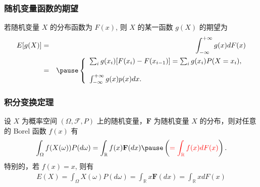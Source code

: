 \documentclass[Prob-All.tex]{subfiles}
\begin{document}
\begin{frame}
		\frametitle{随机变量函数的期望}
		\begin{thm}
			若随机变量 $X$ 的分布函数为 $F (x)$, 则 $X$ 的某一函数 $g (X)$ 的期望为
			\begin{eqnarray*}
				E[g(X)]&=&\int_{-\infty}^{+\infty}g(x)dF(x)\\
				&=&\pause \left\{
				\begin{array}{l}
					\sum_{i}g(x_i)[F(x_i)-F(x_{i-1})]=\sum_{i}g(x_i)P(X=x_i),\\
					\\
					\int_{-\infty}^{+\infty}g(x)p(x)dx.
				\end{array}
				\right.
			\end{eqnarray*}

		\end{thm}
	\end{frame}
\begin{frame}
		\frametitle{积分变换定理}
		\begin{thm}
			设 $X$ 为概率空间 $(\Omega,\mathcal{F}, P)$ 上的随机变量，$\mathbf{F}$ 为随机变量 $X$ 的分布，则对任意的 Borel 函数 $f (x)$ 有
			\begin{eqnarray*}
				\int_\Omega f(X(\omega))P(d\omega)= \int_{\mathbb{R}}f(x)\mathbf{F}(dx) \pause \left(\textcolor{red}{= \int_{\mathbb{R}}f(x)dF(x)}\right).
			\end{eqnarray*}
			特别的，若 $f (x)=x$, 则有
			\begin{eqnarray*}
				E(X)=\int_\Omega X(\omega)P(d\omega)=\int_{\mathbb{R}}x \mathbf{F}(dx)=\int_{\mathbb{R}} xdF(x)
			\end{eqnarray*}

		\end{thm}
	\end{frame}
\end{document}
